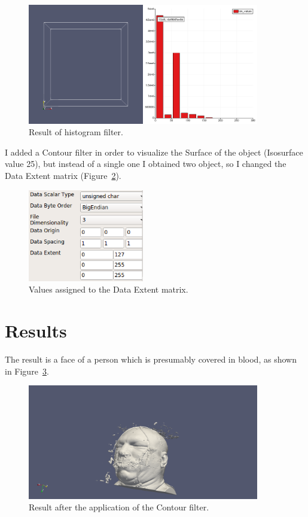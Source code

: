 \documentclass[a4paper]{article}
\begin{document}
\begin{figure}[htbp]
\centering
\includegraphics[width=0.9\textwidth]{res/screen_hist.png}
\caption{Result of histogram filter.}
\label{img:histogram}
\end{figure}

I added a Contour filter in order to visualize the Surface of the object (Isosurface value 25), but instead of a single one I obtained two object, so I changed the Data Extent matrix (Figure~\ref{img:data_extent}).

\begin{figure}[htbp]
\centering
\includegraphics[width=0.45\textwidth]{res/data_extent.png}
\caption{Values assigned to the Data Extent matrix.}
\label{img:data_extent}
\end{figure}

\section{Results}

The result is a face of a person which is presumably covered in blood, as shown in Figure~\ref{img:face}.

\begin{figure}[htbp]
\centering
\includegraphics[width=0.9\textwidth]{res/face.png}
\caption{Result after the application of the Contour filter.}
\label{img:face}
\end{figure}
\end{document}
